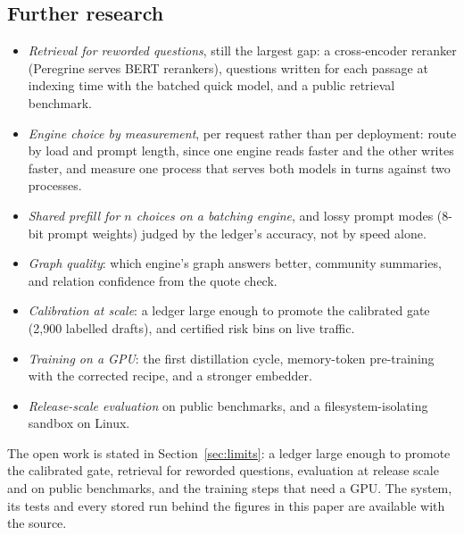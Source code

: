 \subsection*{Further research}
\begin{itemize}
\item \emph{Retrieval for reworded questions}, still the largest gap: a
cross-encoder reranker (Peregrine serves BERT rerankers), questions written
for each passage at indexing time with the batched quick model, and a public
retrieval benchmark.
\item \emph{Engine choice by measurement}, per request rather than per
deployment: route by load and prompt length, since one engine reads faster and
the other writes faster, and measure one process that serves both models in
turns against two processes.
\item \emph{Shared prefill for $n$ choices on a batching engine}, and lossy
prompt modes (8-bit prompt weights) judged by the ledger's accuracy, not by
speed alone.
\item \emph{Graph quality}: which engine's graph answers better, community
summaries, and relation confidence from the quote check.
\item \emph{Calibration at scale}: a ledger large enough to promote the
calibrated gate (2,900 labelled drafts), and certified risk bins on live
traffic.
\item \emph{Training on a GPU}: the first distillation cycle, memory-token
pre-training with the corrected recipe, and a stronger embedder.
\item \emph{Release-scale evaluation} on public benchmarks, and a
filesystem-isolating sandbox on Linux.
\end{itemize}

The open work is stated in Section~\ref{sec:limits}: a ledger large enough to
promote the calibrated gate, retrieval for reworded questions, evaluation at
release scale and on public benchmarks, and the training steps that need a
GPU. The system, its tests and every stored run behind the figures in this
paper are available with the source.
